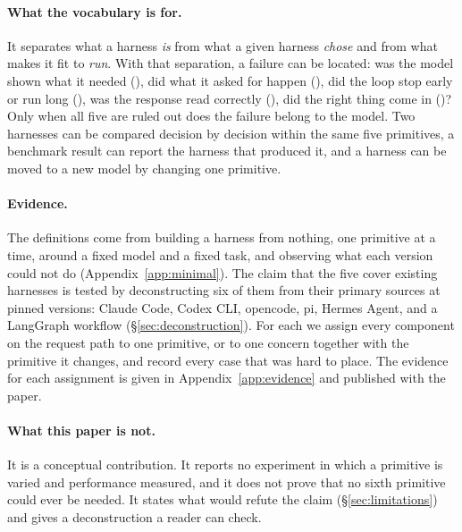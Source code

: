 \paragraph{What the vocabulary is for.} It separates what a harness \emph{is} from what a given harness \emph{chose} and from what makes it fit to \emph{run}. With that separation, a failure can be located: was the model shown what it needed (), did what it asked for happen (), did the loop stop early or run long (), was the response read correctly (), did the right thing come in ()? Only when all five are ruled out does the failure belong to the model. Two harnesses can be compared decision by decision within the same five primitives, a benchmark result can report the harness that produced it, and a harness can be moved to a new model by changing one primitive.

\paragraph{Evidence.} The definitions come from building a harness from nothing, one primitive at a time, around a fixed model and a fixed task, and observing what each version could not do (Appendix~\ref{app:minimal}). The claim that the five cover existing harnesses is tested by deconstructing six of them from their primary sources at pinned versions: Claude Code, Codex CLI, opencode, pi, Hermes Agent, and a LangGraph workflow (\S\ref{sec:deconstruction}). For each we assign every component on the request path to one primitive, or to one concern together with the primitive it changes, and record every case that was hard to place. The evidence for each assignment is given in Appendix~\ref{app:evidence} and published with the paper.

\paragraph{What this paper is not.} It is a conceptual contribution. It reports no experiment in which a primitive is varied and performance measured, and it does not prove that no sixth primitive could ever be needed. It states what would refute the claim (\S\ref{sec:limitations}) and gives a deconstruction a reader can check.

